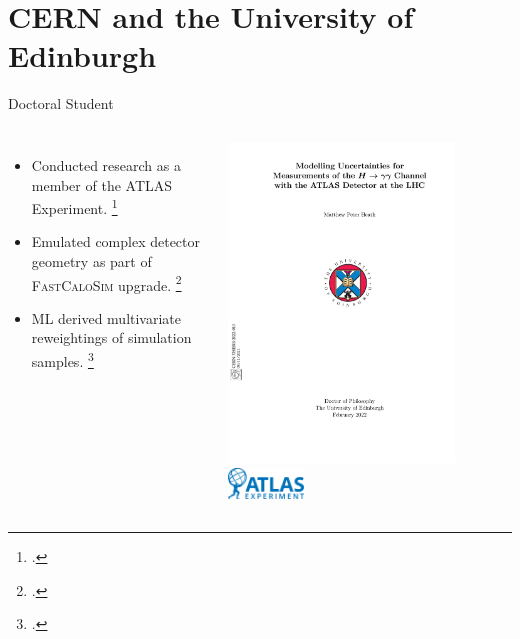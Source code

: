 \documentclass[10pt]{beamer}
\begin{document}
  \section{CERN and the University of Edinburgh}
  \begin{frame}{Doctoral Student}
    \begin{columns}
        \begin{itemize}
          \item Conducted research as a member of the ATLAS Experiment.
          \footcite{thesis}
          \item Emulated complex detector geometry as part of \textsc{FastCaloSim}
          upgrade. \footcite{atlfast3}
          \item ML derived multivariate reweightings of simulation samples.
          \footcite{hgamgam}
        \end{itemize}

        \includegraphics[width=0.8\textwidth, angle=25]{thesis}\\
        \vspace{0.5cm}
        \includegraphics[width=2cm]{atlas-logo}
    \end{columns}
  \end{frame}
\end{document}
